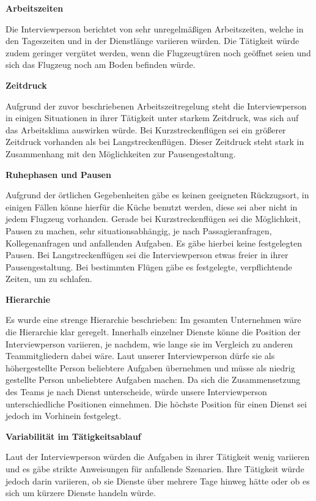 \documentclass[12pt, a4paper]{article}
\begin{document}
\textbf{Arbeitszeiten}

Die Interviewperson berichtet von sehr unregelmäßigen Arbeitszeiten, welche in den Tageszeiten und in der Dienstlänge variieren würden.
Die Tätigkeit würde zudem geringer vergütet werden, wenn die Flugzeugtüren noch geöffnet seien und sich das Flugzeug noch am Boden befinden würde. 

\textbf{Zeitdruck}

Aufgrund der zuvor beschriebenen Arbeitszeitregelung steht die Interviewperson in einigen Situationen in ihrer Tätigkeit unter starkem Zeitdruck,
was sich auf das Arbeitsklima auswirken würde. 
Bei Kurzstreckenflügen sei ein größerer Zeitdruck vorhanden als bei Langstreckenflügen.
Dieser Zeitdruck steht stark in Zusammenhang mit den Möglichkeiten zur Pausengestaltung.

\textbf{Ruhephasen und Pausen}

Aufgrund der örtlichen Gegebenheiten gäbe es keinen geeigneten Rückzugsort, in einigen Fällen könne hierfür die Küche benutzt werden,
diese sei aber nicht in jedem Flugzeug vorhanden.
Gerade bei Kurzstreckenflügen sei die Möglichkeit, Pausen zu machen, sehr situationsabhängig, 
je nach Passagieranfragen, Kollegenanfragen und anfallenden Aufgaben. 
Es gäbe hierbei keine festgelegten Pausen. Bei Langstreckenflügen sei die Interviewperson etwas freier in ihrer Pausengestaltung.
Bei bestimmten Flügen gäbe es festgelegte, verpflichtende Zeiten, um zu schlafen. 

\textbf{Hierarchie}

Es wurde eine strenge Hierarchie beschrieben: Im gesamten Unternehmen wäre die Hierarchie klar geregelt.
Innerhalb einzelner Dienste könne die Position der Interviewperson variieren, je nachdem, wie lange sie im Vergleich zu anderen
Teammitgliedern dabei wäre. Laut unserer Interviewperson dürfe sie als höhergestellte Person beliebtere Aufgaben übernehmen und müsse als 
niedrig gestellte Person unbeliebtere Aufgaben machen. Da sich die Zusammensetzung des Teams je nach Dienst unterscheide, 
würde unsere Interviewperson unterschiedliche Positionen einnehmen. Die höchste Position für einen Dienst sei jedoch im Vorhinein festgelegt. 

\textbf{Variabilität im Tätigkeitsablauf}

Laut der Interviewperson würden die Aufgaben in ihrer Tätigkeit wenig variieren und es gäbe strikte Anweisungen für anfallende Szenarien.
Ihre Tätigkeit würde jedoch darin variieren, ob sie Dienste über mehrere Tage hinweg hätte oder ob es sich um kürzere Dienste handeln würde. 
\end{document}
